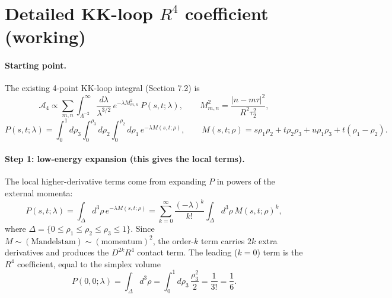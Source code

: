 
\section*{Detailed KK-loop $R^4$ coefficient (working)}

\paragraph{Starting point.}
The existing 4-point KK-loop integral (Section 7.2) is
\begin{equation}
\mathcal{A}_4 \propto \sum_{m,n}\int_{\Lambda^{-2}}^\infty \frac{d\lambda}{\lambda^{3/2}}\,
e^{-\lambda M_{m,n}^2}\, P(s,t;\lambda),\qquad
M_{m,n}^2 = \frac{|n-m\tau|^2}{R^2\tau_2^2},
\end{equation}
\begin{equation}
P(s,t;\lambda) = \int_0^1 d\rho_3\int_0^{\rho_3}d\rho_2\int_0^{\rho_2}d\rho_1\,
e^{-\lambda M(s,t;\rho)},\qquad
M(s,t;\rho) = s\rho_1\rho_2 + t\rho_2\rho_3 + u\rho_1\rho_3 + t(\rho_1-\rho_2).
\end{equation}

\paragraph{Step 1: low-energy expansion (this gives the local terms).}
The local higher-derivative terms come from expanding $P$ in powers of the external momenta:
\begin{equation}
P(s,t;\lambda) = \int_\Delta d^3\rho\, e^{-\lambda M(s,t;\rho)}
= \sum_{k=0}^\infty \frac{(-\lambda)^k}{k!}\int_\Delta d^3\rho\, M(s,t;\rho)^k,
\end{equation}
where $\Delta = \{0\le\rho_1\le\rho_2\le\rho_3\le1\}$.
Since $M \sim (\text{Mandelstam}) \sim (\text{momentum})^2$, the order-$k$ term carries $2k$ extra derivatives and produces the $D^{2k}R^4$ contact term.
The leading ($k=0$) term is the $R^4$ coefficient, equal to the simplex volume
\begin{equation}
P(0,0;\lambda) = \int_\Delta d^3\rho
= \int_0^1 d\rho_3\,\frac{\rho_3^2}{2} = \frac{1}{3!} = \frac{1}{6}.
\end{equation}


